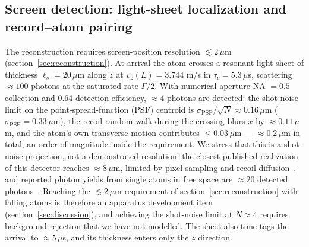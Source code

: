 \documentclass[11pt,a4paper]{article}
\begin{document}
\subsection{Screen detection: light-sheet localization and record--atom pairing}
\label{sec:detection}
The reconstruction requires screen-position resolution $\lesssim 2\,\mu$m (section~\ref{sec:reconstruction}). At arrival the atom crosses a resonant light sheet of thickness $\ell_s = 20\,\mu$m along $z$ at $v_z(L) = 3.744$ m/s in $\tau_c = 5.3\,\mu$s, scattering $\approx 100$ photons at the saturated rate $\Gamma/2$. With numerical aperture NA $= 0.5$ collection and $0.64$ detection efficiency, $\approx 4$ photons are detected: the shot-noise limit on the point-spread-function (PSF) centroid is $\sigma_\text{PSF}/\sqrt{N} \approx 0.16\,\mu$m ($\sigma_\text{PSF} = 0.33\,\mu$m), the recoil random walk during the crossing blurs $x$ by $\approx 0.11\,\mu$m, and the atom's own transverse motion contributes $\leq 0.03\,\mu$m --- $\approx 0.2\,\mu$m in total, an order of magnitude inside the requirement. We stress that this is a shot-noise projection, not a demonstrated resolution: the closest published realization of this detector reaches $\approx 8\,\mu$m, limited by pixel sampling and recoil diffusion~\cite{Bucker2009}, and reported photon yields from single atoms in free space are $\approx 20$ detected photons~\cite{Bergschneider2018, Bondo2006}. Reaching the $\lesssim 2\,\mu$m requirement of section~\ref{sec:reconstruction} with falling atoms is therefore an apparatus development item (section~\ref{sec:discussion}), and achieving the shot-noise limit at $N \approx 4$ requires background rejection that we have not modelled. The sheet also time-tags the arrival to $\approx 5\,\mu$s, and its thickness enters only the $z$ direction.
\end{document}
